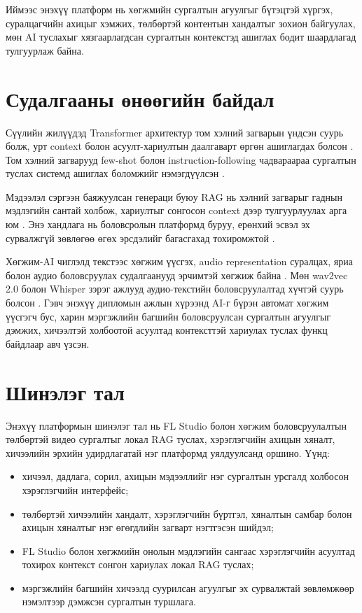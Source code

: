 Иймээс энэхүү платформ нь хөгжмийн сургалтын агуулгыг бүтэцтэй хүргэх, суралцагчийн ахицыг хэмжих, төлбөртэй контентын хандалтыг зохион байгуулах, мөн AI туслахыг хязгаарлагдсан сургалтын контекстэд ашиглах бодит шаардлагад тулгуурлаж байна.

\section*{Судалгааны өнөөгийн байдал}
Сүүлийн жилүүдэд Transformer архитектур том хэлний загварын үндсэн суурь болж, урт context болон асуулт-хариултын даалгаварт өргөн ашиглагдах болсон \cite{attention_vaswani_2017}. Том хэлний загварууд few-shot болон instruction-following чадвараараа сургалтын туслах системд ашиглах боломжийг нэмэгдүүлсэн \cite{gpt3_brown_2020,llama_touvron_2023}.

Мэдээлэл сэргээн баяжуулсан генераци буюу RAG нь хэлний загварыг гаднын мэдлэгийн сантай холбож, хариултыг сонгосон context дээр тулгуурлуулах арга юм \cite{rag_lewis_2020}. Энэ хандлага нь боловсролын платформд буруу, ерөнхий эсвэл эх сурвалжгүй зөвлөгөө өгөх эрсдэлийг багасгахад тохиромжтой \cite{atlas_izacard_2022}.

Хөгжим-AI чиглэлд текстээс хөгжим үүсгэх, audio representation суралцах, яриа болон аудио боловсруулах судалгаанууд эрчимтэй хөгжиж байна \cite{jukebox_dhariwal_2020,audiolm_borsos_2022,musicgen_2023,musiclm_2023}. Мөн wav2vec 2.0 болон Whisper зэрэг ажлууд аудио-текстийн боловсруулалтад хүчтэй суурь болсон \cite{wav2vec2_baevski_2020,whisper_radford_2022}. Гэвч энэхүү дипломын ажлын хүрээнд AI-г бүрэн автомат хөгжим үүсгэгч бус, харин мэргэжлийн багшийн боловсруулсан сургалтын агуулгыг дэмжих, хичээлтэй холбоотой асуултад контексттэй хариулах туслах функц байдлаар авч үзсэн.

\section*{Шинэлэг тал}
Энэхүү платформын шинэлэг тал нь FL Studio болон хөгжим боловсруулалтын төлбөртэй видео сургалтыг локал RAG туслах, хэрэглэгчийн ахицын хяналт, хичээлийн эрхийн удирдлагатай нэг платформд уялдуулсанд оршино. Үүнд:
\begin{itemize}
    \item хичээл, дадлага, сорил, ахицын мэдээллийг нэг сургалтын урсгалд холбосон хэрэглэгчийн интерфейс;
    \item төлбөртэй хичээлийн хандалт, хэрэглэгчийн бүртгэл, хяналтын самбар болон ахицын хяналтыг нэг өгөгдлийн загварт нэгтгэсэн шийдэл;
    \item FL Studio болон хөгжмийн онолын мэдлэгийн сангаас хэрэглэгчийн асуултад тохирох контекст сонгон хариулах локал RAG туслах;
    \item мэргэжлийн багшийн хичээлд суурилсан агуулгыг эх сурвалжтай зөвлөмжөөр нэмэлтээр дэмжсэн сургалтын туршлага.
\end{itemize}

